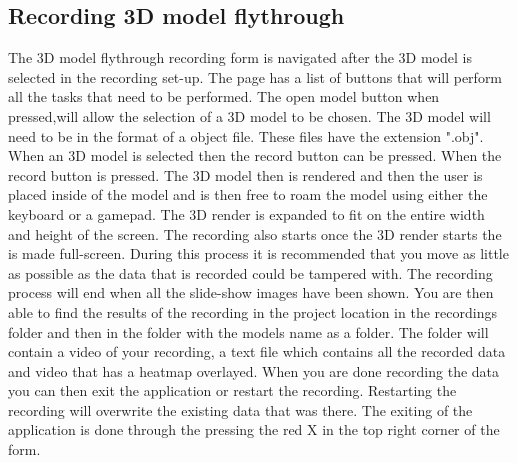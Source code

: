 \subsection{Recording 3D model flythrough}
The 3D model flythrough recording form is navigated after the 3D model is selected in the recording set-up. The page has a list of buttons that will perform all the tasks that need to be performed. The open model button when pressed,will allow the selection of a 3D model to be chosen. The 3D model will need to be in the format of a object file. These files have the extension ".obj". When an 3D model is selected then the record button can be pressed. When the record button is pressed. The 3D model then is rendered and then the user is placed inside of the model and is then free to roam the model using either the keyboard or a gamepad. The 3D render is expanded to fit on the entire width and height of the screen. The recording also starts once the 3D render starts the is made full-screen. During this process it is recommended that you move as little as possible as the data that is recorded could be tampered with. The recording process will end when all the slide-show images have been shown. You are then able to find the results of the recording in the project location in the recordings folder and then in the folder with the models name as a folder. The folder will contain a video of your recording, a text file which contains all the recorded data and video that has a heatmap overlayed. When you are done recording the data you can then exit the application or restart the recording. Restarting the recording will overwrite the existing data that was there. The exiting of the application is done through the pressing the red X in the top right corner of the form.

